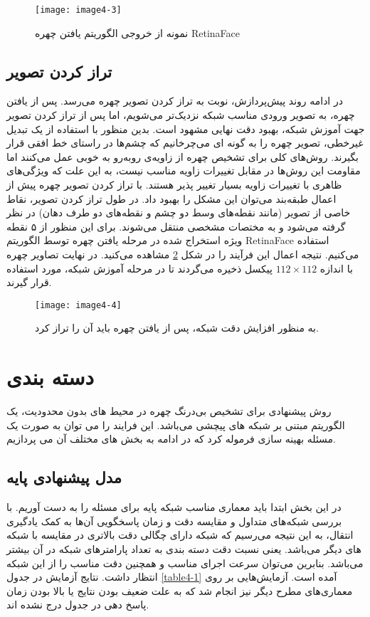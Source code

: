 \begin{figure}[h]
\centering
  \texttt{[image: image4-3]}
  \caption{نمونه از خروجی الگوریتم یافتن چهره RetinaFace}
  \label{image4-3}
\end{figure}

\subsection{تراز کردن تصویر}
در ادامه روند پیش‌پردازش، نوبت به تراز کردن تصویر چهره  می‌رسد. پس از یافتن چهره، به تصویر ورودی مناسب شبکه نزدیک‌تر می‌شویم، اما پس از تراز کردن تصویر جهت آموزش شبکه، بهبود دقت نهایی مشهود است.  بدین منظور با استفاده از یک تبدیل غیرخطی، تصویر چهره را به گونه ای می‌چرخانیم که چشم‌ها در راستای خط افقی قرار بگیرند. روش‌های کلی برای تشخیص چهره از زاویه‌ی روبه‌رو به خوبی عمل می‌کنند اما مقاومت این روش‌ها در مقابل تغییرات زاویه مناسب نیست، به این علت که ویژگی‌های ظاهری با تغییرات زاویه بسیار تغییر پذیر هستند. با تراز کردن تصویر چهره پیش از اعمال طبقه‌بند می‌توان این مشکل را بهبود داد. در طول ‌تراز کردن تصویر، نقاط خاصی از تصویر (مانند نقطه‌های‌ وسط دو چشم و نقطه‌های دو طرف دهان) در نظر گرفته می‌شود و به مختصات مشخصی منتقل می‌شوند. برای این منظور از ۵ نقطه ویژه استخراج شده در مرحله یافتن چهره توسط الگوریتم RetinaFace استفاده می‌کنیم. نتیجه اعمال این فرآیند را در شکل \ref{image4-4} مشاهده می‌کنید. در نهایت تصاویر چهره با اندازه $112 \times 112$ پیکسل ذخیره می‌گردند تا در مرحله آموزش شبکه، مورد استفاده قرار گیرند.
\begin{figure}[h]
\centering
  \texttt{[image: image4-4]}
  \caption{به منظور افزایش دقت شبکه، پس از یافتن چهره باید آن را تراز کرد.}
  \label{image4-4}
\end{figure}

\section{دسته بندی}
روش پیشنهادی برای تشخیص بی‌درنگ چهره در محیط های بدون محدودیت، یک الگوریتم مبتنی بر شبکه های پیچشی می‌باشد. این فرایند را می توان به صورت یک مسئله بهینه سازی فرموله کرد که در ادامه به بخش های مختلف آن می پردازیم.

\subsection{مدل پیشنهادی پایه}
در این بخش ابتدا باید معماری مناسب شبکه پایه برای مسئله را به دست آوریم. با بررسی شبکه‌های متداول و مقایسه دقت و زمان پاسخگویی آن‌ها به کمک یادگیری انتقال، به این نتیجه می‌رسیم که شبکه  دارای چگالی دقت بالاتری در مقایسه با شبکه های دیگر می‌باشد. یعنی نسبت دقت دسته بندی به تعداد پارامترهای شبکه در آن‌ بیشتر می‌باشد. بنابرین می‌توان سرعت اجرای مناسب و همچنین دقت مناسب را از این شبکه‌ انتظار داشت. نتایج آزمایش در جدول \ref{table4-1} آمده است. آزمایش‌هایی بر روی معماری‌های مطرح دیگر نیز انجام شد که به علت ضعیف بودن نتایج یا بالا بودن زمان پاسخ دهی در جدول درج نشده اند.

